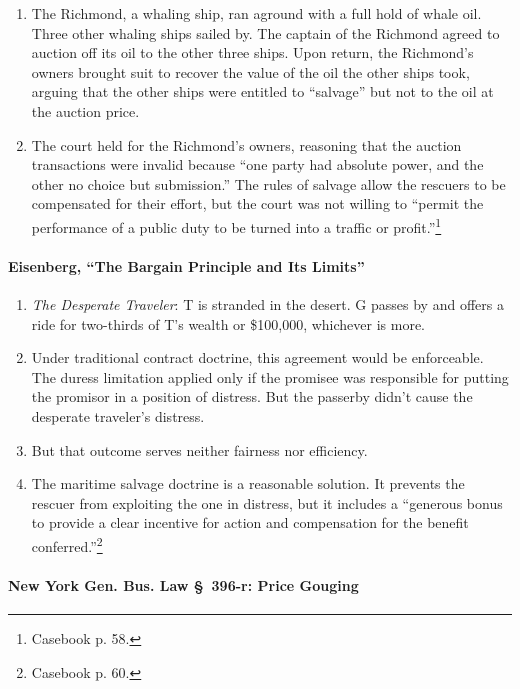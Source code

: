 \begin{enumerate}
    \item The Richmond, a whaling ship, ran aground with a full hold of whale 
    oil. Three other whaling ships sailed by. The captain of the Richmond 
    agreed to auction off its oil to the other three ships. Upon return, the 
    Richmond's owners brought suit to recover the value of the oil the other 
    ships took, arguing that the other ships were entitled to ``salvage'' but 
    not to the oil at the auction price.
    \item The court held for the Richmond's owners, reasoning that the auction 
    transactions were invalid because ``one party had absolute power, and the 
    other no choice but submission.'' The rules of salvage allow the rescuers 
    to be compensated for their effort, but the court was not willing to 
    ``permit the performance of a public duty to be turned into a traffic or 
    profit.''\footnote{Casebook p. 58.}
\end{enumerate}

\paragraph{Eisenberg, ``The Bargain Principle and Its Limits''}

\begin{enumerate}
    \item \emph{The Desperate Traveler}: T is stranded in the desert. G passes 
    by and offers a ride for two-thirds of T's wealth or \$100,000, whichever 
    is more.
    \item Under traditional contract doctrine, this agreement would be 
    enforceable. The duress limitation applied only if the promisee was 
    responsible for putting the promisor in a position of distress. But the 
    passerby didn't cause the desperate traveler's distress.
    \item But that outcome serves neither fairness nor efficiency.
    \item The maritime salvage doctrine is a reasonable solution. It prevents 
    the rescuer from exploiting the one in distress, but it includes a 
    ``generous bonus to provide a clear incentive for action and compensation 
    for the benefit conferred.''\footnote{Casebook p. 60.}
\end{enumerate}

\paragraph{New York Gen. Bus. Law \S\ 396-r: Price Gouging}

